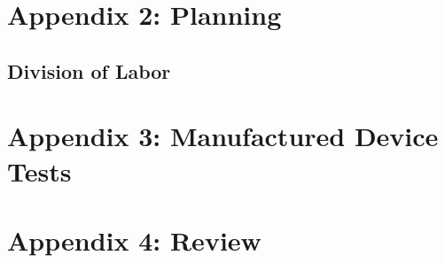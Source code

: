 \documentclass{article}
\begin{document}
\section{Appendix 2: Planning}

\subsection{Division of Labor}
\pagebreak

\section{Appendix 3: Manufactured Device Tests}


\section{Appendix 4: Review}
\end{document}
